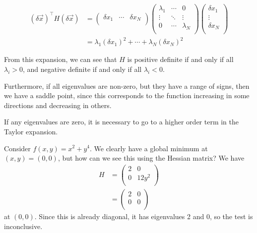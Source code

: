 \documentclass{../../template/note}
\begin{document}
    \begin{align*}
        (\delta \vec x)^\intercal H (\delta \vec x) &= \begin{pmatrix}
         \delta x_1 & \cdots & \delta x_N \\
        \end{pmatrix} \begin{pmatrix}
         \lambda_1 & \cdots & 0 \\
         \vdots & \ddots & \vdots \\
         0 & \cdots & \lambda_N \\
        \end{pmatrix} \begin{pmatrix}
         \delta x_1 \\
         \vdots \\
         \delta x_N \\
        \end{pmatrix} \\
        &= \lambda_1 (\delta x_1)^2 + \cdots + \lambda_N (\delta x_N)^2
    \end{align*}
    
    From this expansion, we can see that \(H\) is positive definite if and only if all \(\lambda_i > 0\), and negative definite if and only if all \(\lambda_i < 0\).

    Furthermore, if all eigenvalues are non-zero, but they have a range of signs, then we have a saddle point, since this corresponds to the function increasing in some directions and decreasing in others.

    If any eigenvalues are zero, it is necessary to go to a higher order term in the Taylor expansion.

    \begin{example}
        Consider \(f(x, y) = x^2 + y^4\). We clearly have a global minimum at \((x, y) = (0, 0)\), but how can we see this using the Hessian matrix? We have
        \begin{align*}
            H &= \begin{pmatrix}
             2 & 0 \\
             0 & 12y^2 \\
            \end{pmatrix} \\
            &= \begin{pmatrix}
             2 & 0 \\
             0 & 0 \\
            \end{pmatrix}
        \end{align*}
        at \((0, 0)\). Since this is already diagonal, it has eigenvalues 2 and 0, so the test is inconclusive.        
    \end{example}
    
\end{document}
